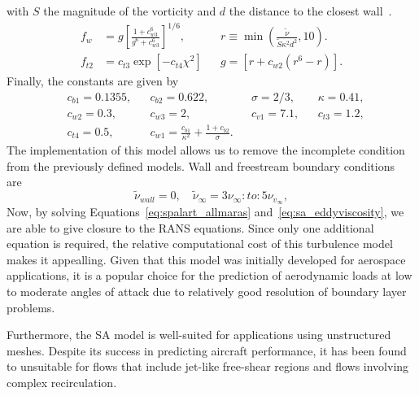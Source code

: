 with $S$ the magnitude of the vorticity and $d$ the distance to the closest wall~\cite{spalartOneequationTurbulenceModel1992}. 
\begin{align}
    f_w&=g
    \left[\frac{1+c_{w3}^6}{g^6+c_{w3}^6}\right]^{1/6},& &r\equiv \min\left(\frac{\tilde\nu}{\tilde S \kappa^2 d^2},10\right). \\
    f_{t2}&=c_{t3} \exp \left[-c_{t4}\chi^2\right] & &g=\left[r+c_{w2}\left(r^6-r\right)\right].
\end{align}
Finally, the constants are given by 
\begin{align}
    &c_{b1} = 0.1355,& &c_{b2} =0.622,& &\sigma = 2/3,& &\kappa=0.41, \\
    &c_{w2} = 0.3,&    &c_{w3} =2,&     &c_{v1} = 7.1,&   &c_{t3}=1.2,  \\
    &c_{t4} = 0.5,&      &c_{w1} = \frac{c_{b1}}{\kappa^2} + \frac{1+c_{b2}}{\sigma}.
\end{align}
The implementation of this model allows us to remove the incomplete condition from the previously defined models. Wall and freestream boundary conditions are~\cite{rumseyRecentDevelopmentsTurbulence2015}
\begin{equation}
    \tilde \nu_{wall} = 0,\quad \tilde\nu_{\infty}=3 \nu_{\infty}:to:5\nu_{v_\infty},
\end{equation}
Now, by solving Equations~\ref{eq:spalart_allmaras} and~\ref{eq:sa_eddyviscosity}, we are able to give closure to the RANS equations. Since only one additional equation is required, the relative computational cost of this turbulence model makes it appealling. Given that this model was initially developed for aerospace applications, it is a popular choice for the prediction of aerodynamic loads at low to moderate angles of attack due to relatively good resolution of boundary layer problems. 

Furthermore, the SA model is well-suited for applications using unstructured meshes. Despite its success in predicting aircraft performance, it has been found to unsuitable for flows that include jet-like free-shear regions and flows involving complex recirculation.
